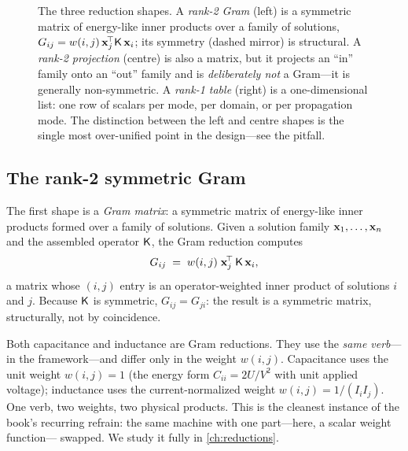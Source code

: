 \begin{figure}[t]
\caption[The three reduction shapes]{The three reduction shapes. A
\emph{rank-2 Gram} (left) is a symmetric matrix of energy-like inner products
over a family of solutions, $G_{ij}=w(i,j)\,\mathbf{x}_j^{\!\top}\mathsf{K}\,\mathbf{x}_i$; its
symmetry (dashed mirror) is structural. A \emph{rank-2 projection} (centre) is
also a matrix, but it projects an ``in'' family onto an ``out'' family and is
\emph{deliberately not} a Gram---it is generally non-symmetric. A \emph{rank-1
table} (right) is a one-dimensional list: one row of scalars per mode, per
domain, or per propagation mode. The distinction between the left and centre
shapes is the single most over-unified point in the design---see the pitfall.}
\label{fig:reductions}
\end{figure}

\subsection{The rank-2 symmetric Gram}

The first shape is a \emph{Gram matrix}: a symmetric matrix of energy-like inner
products formed over a family of solutions. Given a solution family
$\mathbf{x}_1,\dots,\mathbf{x}_n$ and the assembled operator $\mathsf{K}$, the Gram reduction
computes
\[
  G_{ij} \;=\; w(i,j)\;\mathbf{x}_j^{\!\top}\,\mathsf{K}\,\mathbf{x}_i,
\]
a matrix whose $(i,j)$ entry is an operator-weighted inner product of solutions
$i$ and $j$. Because $\mathsf{K}$ is symmetric, $G_{ij}=G_{ji}$: the result is a
symmetric matrix, structurally, not by coincidence.

Both capacitance and inductance are Gram reductions. They use the \emph{same
verb}--- in the framework---and differ only in the weight
$w(i,j)$. Capacitance uses the unit weight $w(i,j)=1$ (the energy form
$C_{ii}=2U/V^2$ with unit applied voltage); inductance uses the
current-normalized weight $w(i,j)=1/(I_i I_j)$. One verb, two weights, two
physical products. This is the cleanest instance of the book's recurring
refrain: the same machine with one part---here, a scalar weight function---
swapped. We study it fully in \cref{ch:reductions}.

